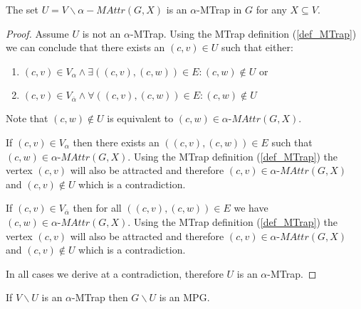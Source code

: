 \begin{lemma}
	\label{lem_MPG_attr_exc_trap}
	The set $U=V\backslash \alpha{-}MAttr(G,X)$ is an $\alpha$-MTrap in $G$ for any $X \subseteq V$.
	\begin{proof}
		Assume $U$ is not an $\alpha$-MTrap. Using the MTrap definition (\ref{def_MTrap}) we can conclude that there exists an $(c,v) \in U$ such that either:
		\begin{enumerate}
			\item $(c,v) \in V_\alpha \wedge \exists((c,v),(c,w)) \in E: (c,w) \notin U$ or
			\item $(c,v) \in V_{\overline{\alpha}} \wedge \forall((c,v),(c,w)) \in E: (c,w) \notin U$
		\end{enumerate}
		Note that $(c,w) \notin U$ is equivalent to $(c,w) \in \alpha\textit{-MAttr}(G,X)$.
		
		If $(c,v) \in V_\alpha$ then there exists an $((c,v),(c,w)) \in E$ such that $(c,w) \in \alpha\textit{-MAttr}(G,X)$. Using the MTrap definition (\ref{def_MTrap}) the vertex $(c,v)$ will also be attracted and therefore $(c,v) \in \alpha\textit{-MAttr}(G,X)$ and $(c,v) \notin U$ which is a contradiction.
		
		If $(c,v) \in V_{\overline{\alpha}}$ then for all $((c,v),(c,w)) \in E$ we have $(c,w) \in \alpha\textit{-MAttr}(G,X)$. Using the MTrap definition (\ref{def_MTrap}) the vertex $(c,v)$ will also be attracted and therefore $(c,v) \in \alpha\textit{-MAttr}(G,X)$ and $(c,v) \notin U$ which is a contradiction.
		
		In all cases we derive at a contradiction, therefore $U$ is an $\alpha$-MTrap.
	\end{proof}
\end{lemma}

\begin{lemma}
	\label{lem_MPG_sub_trap_is_MPG}
	If $V\backslash U$ is an $\alpha$-MTrap then $G\backslash U$ is an MPG.
\end{lemma}

